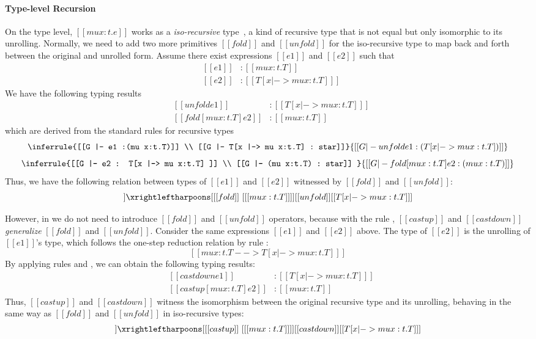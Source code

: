 \paragraph{Type-level Recursion}

On the type level, $[[mu x:t.e]]$ works as a \emph{iso-recursive}
type~\cite{eqi:iso}, a kind of recursive type that is not equal but only isomorphic
to its unrolling. Normally, we need to add two more primitives
$[[fold]]$ and $[[unfold]]$ for the iso-recursive type to map back
and forth between the original and unrolled form. Assume there exist
expressions $[[e1]]$ and $[[e2]]$ such that
\[\begin{array}{lll}
  &[[e1]] &: [[mu x:t.T]]\\
  &[[e2]] &: [[T [x |-> mu x:t.T] ]]
\end{array}\]
We have the following typing results
\[\begin{array}{lll}
  &[[unfold e1]] &: [[T [x |-> mu x:t.T] ]]\\
  &[[fold [mu x:t.T] e2]] &: [[mu x:t.T]]
\end{array}\]
which are derived from the standard rules for recursive types~\cite{tapl}
{
\small
\[ \inferrule{[[G |- e1 :(mu x:t.T)]] \\ [[G |- T[x |-> mu x:t.T] : star]]}
   {[[G |- unfold e1 : (T[x |-> mu x:t.T]) ]]} \]
\[ \inferrule{[[G |- e2 : T[x |-> mu x:t.T] ]] \\ [[G |- (mu x:t.T) : star]] }
   {[[G |- fold [mu x:t.T] e2 : (mu x:t.T) ]]} \]}
Thus, we have the following relation between types of $[[e1]]$ and $[[e2]]$
witnessed by $[[fold]]$ and $[[unfold]]$:
\begin{align*}
  [[mu x:t.T]] \xrightleftharpoons[{[[fold]]~[ [[mu x:t.T]] ]}]
  {[[unfold]]} [[T[x |-> mu x:t.T] ]]
\end{align*}

However, in \name we do not need to introduce $[[fold]]$ and
$[[unfold]]$ operators, because with the rule ,
$[[castup]]$ and $[[castdown]]$ \emph{generalize} $[[fold]]$ and $[[unfold]]$.
Consider the same expressions $[[e1]]$ and $[[e2]]$ above. The type of
$[[e2]]$ is the unrolling of $[[e1]]$'s type, which follows the
one-step reduction relation by rule :
\[ [[mu x:t.T --> T [x |-> mu x:t.T] ]] \]
By applying rules  and , we
can obtain the following typing results:
\[\begin{array}{lll}
  &[[castdown e1]] &: [[T [x |-> mu x:t.T] ]]\\
  &[[castup [mu x:t.T] e2]] &: [[mu x:t.T]]
\end{array}\]
Thus, $[[castup]]$ and $[[castdown]]$ witness the isomorphism between
the original recursive type and its unrolling, behaving in the
same way
as $[[fold]]$ and $[[unfold]]$ in iso-recursive types:
\begin{align*}
  [[mu x:t.T]] \xrightleftharpoons[{[[castup]]~[ [[mu x:t.T]]
  ]}]{[[castdown]]} [[T[x |-> mu x:t.T] ]]
\end{align*}

